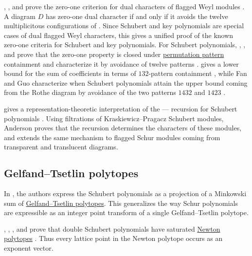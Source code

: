 , , and 
prove the zero-one criterion for dual characters of flagged Weyl modules
\cite{GuoLinPeng2025}.  A diagram $D$ has zero-one dual character if and only
if it avoids the twelve multiplicitous configurations of
\cite[Fig.~1.1]{GuoLinPeng2025}.  Since Schubert and key polynomials are
special cases of dual flagged Weyl characters, this gives a unified proof of
the known zero-one criteria for Schubert and key polynomials.
For Schubert polynomials, , , and
 prove that the zero-one property is
closed under \hyperref[permutationPattern]{permutation pattern} containment
and characterize it by avoidance of twelve patterns
\cite{FinkMeszarosDizier2019x}.   gives a lower bound for
the sum of coefficients in terms of $132$-pattern containment
\cite{Weigandt2018}, while Fan and Guo characterize when Schubert polynomials
attain the upper bound coming from the Rothe diagram by avoidance of the two
patterns $1432$ and $1423$ \cite{FanGuo2019}.

 gives a representation-theoretic interpretation of the
---- recursion for
Schubert polynomials \cite{Anderson2024SchubertModulesx}.  Using filtrations of
Kraskiewicz--Pragacz Schubert modules, Anderson proves that the recursion
determines the characters of these modules, and extends the same mechanism to
flagged Schur modules coming from transparent and translucent diagrams.


\subsection[schubertGTFormula]{Gelfand--Tsetlin polytopes}

In \cite{LiuMeszarosDizier2019}, the authors express the Schubert polynomials
as a projection of a Minkowski sum of \hyperref[gtpolytopes]{Gelfand--Tsetlin polytopes}.
This generalizes the way Schur polynomials are expressible as
an integer point transform of a single Gelfand--Tsetlin polytope.

, , ,
and  prove that double Schubert polynomials have
saturated \hyperref[newtonPolytope]{Newton polytopes}
\cite{CastilloCidRuizMohammadiMontano2023}.
Thus every lattice point in the Newton polytope occurs as an exponent vector.

